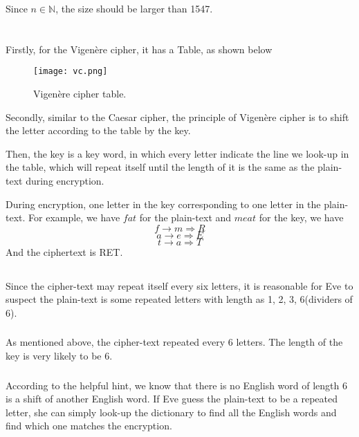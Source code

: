 \documentclass[12pt,a4paper]{article}
\theoremstyle{definition}
\begin{document}
Since $n\in \mathbb{N}$, the size should be larger than 1547. 
\newpage
\section{}
\subsection{}
Firstly, for the Vigenère cipher, it has a Table, as shown below
\begin{figure}[h!]
\centering
\texttt{[image: vc.png]}
\caption{Vigenère cipher table. }
\end{figure}


Secondly, similar to the Caesar cipher, the principle of Vigenère cipher is to shift the letter according to the table by the key. 

Then, the key is a key word, in which every letter indicate the line we look-up in the table, which will repeat itself until the length of it is the same as the plain-text during encryption. 

During encryption, one letter in the key corresponding to one letter in the plain-text. For example, we have $fat$ for the plain-text and $meat$ for the key, we have 
$$f\rightarrow m\Rightarrow R$$
$$a\rightarrow e\Rightarrow E$$
$$t\rightarrow a\Rightarrow T$$
And the ciphertext is RET. 
\subsection{}
\subsubsection{}
Since the cipher-text may repeat itself every six letters, it is reasonable for Eve to suspect the plain-text is some repeated letters with length as 1, 2, 3, 6(dividers of 6). 
\subsubsection{}
As mentioned above, the cipher-text repeated every 6 letters. The length of the key is very likely to be 6. 
\subsubsection{}
According to the helpful hint, we know that there is no English word of length 6 is a shift of another English word. If Eve guess the plain-text to be a repeated letter, she can simply look-up the dictionary to find all the English words and find which one matches the encryption. 
\end{document}
